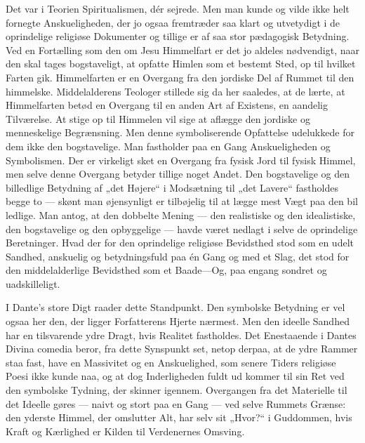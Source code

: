 \documentclass[12pt,a4paper]{article}
\newcommand{\opage}[1]{\marginnote{\footnotesize\textit{[#1]}}}
\begin{document}
Det var i Teorien Spiritualismen, dér sejrede. Men man kunde og vilde ikke
helt fornegte Anskueligheden, der jo ogsaa fremtræder saa klart og
utvetydigt i de oprindelige religiøse Dokumenter og tillige er af saa stor
pædagogisk Betydning. Ved en Fortælling som den om Jesu Himmelfart er det
jo aldeles nødvendigt, naar den skal tages bogstaveligt, at opfatte Himlen
som et bestemt Sted, op til hvilket Farten gik. Himmelfarten er en
Overgang fra den jordiske Del af Rummet til den himmelske. Middelalderens
Teologer stillede sig da her saaledes, at de lærte, at Himmelfarten betød
en Overgang til en anden Art af Existens, en aandelig Tilværelse. At stige
op til Himmelen vil sige at aflægge den jordiske og menneskelige
Begrænsning. Men denne symboliserende Opfattelse udelukkede for dem ikke
den bogstavelige. Man fastholder paa en Gang Anskueligheden og
Symbolismen. Der er virkeligt sket en Overgang fra fysisk Jord til fysisk
Himmel, men selve denne Overgang betyder tillige noget Andet. Den
bogstavelige og den billedlige Betydning af „det Højere“ i Modsætning til
„det Lavere“ fastholdes begge to --- skønt man øjensynligt er tilbøjelig
til at lægge mest Vægt paa den bil%
\opage{7}ledlige. Man antog, at den dobbelte
Mening --- den realistiske og den idealistiske, den bogstavelige og den
opbyggelige --- havde været nedlagt i selve de oprindelige Beretninger.
Hvad der for den oprindelige religiøse Bevidsthed stod som en udelt
Sandhed, anskuelig og betydningsfuld paa én Gang og med et Slag, det stod
for den middelalderlige Bevidsthed som et Baade---Og, paa engang sondret
og uadskilleligt.

I Dante's store Digt raader dette Standpunkt. Den symbolske Betydning er
vel ogsaa her den, der ligger Forfatterens Hjerte nærmest. Men den ideelle
Sandhed har en tilsvarende ydre Dragt, hvis Realitet fastholdes. Det
Enestaaende i Dantes Divina comedia beror, fra dette Synspunkt set, netop
derpaa, at de ydre Rammer staa fast, have en Massivitet og en
Anskuelighed, som senere Tiders religiøse Poesi ikke kunde naa, og at dog
Inderligheden fuldt ud kommer til sin Ret ved den symbolske Tydning, der
skinner igennem. Overgangen fra det Materielle til det Ideelle gøres ---
naivt og stort paa en Gang --- ved selve Rummets Grænse: den yderste
Himmel, der omslutter Alt, har selv sit „Hvor?“ i Guddommen, hvis Kraft og
Kærlighed er Kilden til Verdenernes Omsving.
\end{document}
